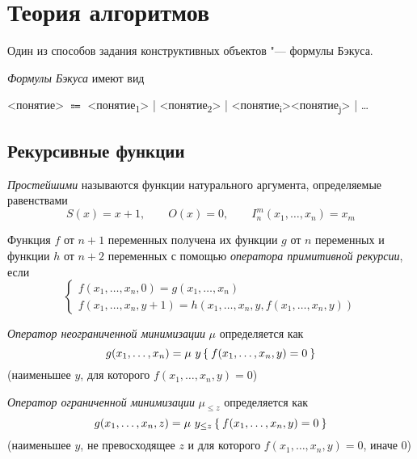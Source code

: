 \chapter{Теория алгоритмов}

Один из способов задания конструктивных объектов "--- формулы Бэкуса.

\begin{definition}
	\emph{Формулы Бэкуса} имеют вид

	<понятие> $ \Coloneq $ <понятие\textsubscript1> | <понятие\textsubscript2> | <понятие\textsubscript i><понятие\textsubscript j> | \dots
\end{definition}

\section{Рекурсивные функции}

\begin{definition}
	\emph{Простейшими} называются функции натурального аргумента, определяемые равенствами
	$$ S(x) = x + 1, \qquad O(x) = 0, \qquad I_n^m(x_1, \dots, x_n) = x_m $$
\end{definition}

\begin{definition}
	Функция $ f $ от $ n + 1 $ переменных получена их функции $ g $ от $ n $ переменных и функции $ h $ от $ n + 2 $ переменных с помощью \emph{оператора примитивной рекурсии}, если
	$$
	\begin{cases}
		f(x_1, \dots, x_n, 0) = g(x_1, \dots, x_n) \\
		f(x_1, \dots, x_n, y + 1) = h(x_1, \dots, x_n, y, f(x_1, \dots, x_n, y))
	\end{cases} $$
\end{definition}

\begin{definition}
	\emph{Оператор неограниченной минимизации} $ \mu $ определяется как
	$$ g(x_1, \dots, x_n) = \mu~y \Set{f(x_1, \dots, x_n, y) = 0} $$
	(наименьшее $ y $, для которого $ f(x_1, \dots, x_n, y) = 0 $)
\end{definition}

\begin{definition}
	\emph{Оператор ограниченной минимизации} $ \mu_{\le z} $ определяется как
	$$ g(x_1, \dots, x_n, z) = \mu~y_{\le z} \Set{f(x_1, \dots, x_n, y) = 0} $$
	(наименьшее $ y $, не превосходящее $ z $ и для которого $ f(x_1, \dots, x_n, y) = 0 $, иначе 0)
\end{definition}

